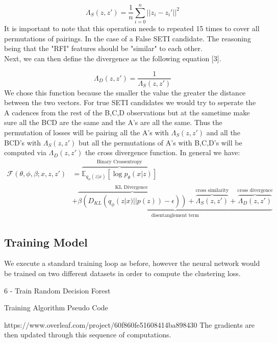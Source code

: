 \documentclass{article}
\begin{document}
\begin{equation}
\Lambda_S(z,z')= \frac{1}{n}\sum_{i=0}^{n}||z_i-{z_i}'||^2
\end{equation}
It is important to note that this operation needs to repeated 15 times to cover all permutations of pairings. In the case of a False SETI candidate. The reasoning being that the "RFI" features should be "similar" to each other. \\

Next, we can then define the divergence as the following equation [3]. 

\begin{equation}
\Lambda_D(z,z') = \frac{1}{\Lambda_S(z,z')}
\end{equation}
We chose this function because the smaller the value the greater the distance between the two vectors. For true SETI candidates we would try to seperate the A cadences from the rest of the B,C,D observations but at the sametime make sure all the BCD are the same and the A's are all the same. Thus the permutation of losses will be pairing all the A's with $\Lambda_S(z,z')$ and all the BCD's with $\Lambda_S(z,z')$ but all the permutations of A's with B,C,D's will be computed via $\Lambda_D(z,z')$ the cross divergence function. In general we have: \\

\begin{equation}
\begin{align}
\mathcal{F}(\theta,\phi,\beta; x,z,z') &= \overbrace{\mathbb{E}_{q_\phi(z|x)}[\log p_\theta(x|z)]}^{\text{Binary Crossentropy}} \\
&+ \underbrace{\overbrace{\beta (D_{KL}(q_\phi(z|x)||p(z))-\epsilon))}^{\text{KL Divergence }} + 
\overbrace{\Lambda_S(z,z')}^{\text{cross similarity}} + \overbrace{\Lambda_{D}(z,z')}^{\text{cross divergence}}}_{\text{disentanglement term}}
\end{align}
\end{equation}

\subsection{Training Model}
We execute a standard training loop as before, however the neural network would be trained on two different datasets in order to compute the clustering loss. \\

\begin{algorithm}[H]
 6 - Train Random Decision Forest 
 \caption{Training Algorithm Pseudo Code }
\end{algorithm}https://www.overleaf.com/project/60f860fe51608414ba898430
The gradients are then updated through this sequence of computations. 
\end{document}
